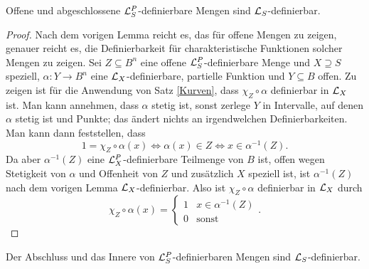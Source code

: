 \begin{theorem}
	Offene und abgeschlossene $\mathcal{L}^P_S$-definierbare Mengen sind $\mathcal{L}_S$-definierbar.
\end{theorem}
\begin{proof}
	Nach dem vorigen Lemma reicht es, das für offene Mengen zu zeigen, genauer reicht es, die Definierbarkeit für charakteristische Funktionen solcher Mengen zu zeigen. Sei $Z\subseteq B^n$ eine offene $\mathcal{L}^P_S$-definierbare Menge und $X\supseteq S$ speziell, $\alpha:Y\rightarrow B^n$ eine $\mathcal{L}_X$-definierbare, partielle Funktion und $Y\subseteq B$ offen. Zu zeigen ist für die Anwendung von Satz \ref{Kurven}, dass $\chi_Z\circ\alpha$ definierbar in $\mathcal{L}_X$ ist. Man kann annehmen, dass $\alpha$ stetig ist, sonst zerlege $Y$ in Intervalle, auf denen $\alpha$ stetig ist und Punkte; das ändert nichts an irgendwelchen Definierbarkeiten. Man kann dann feststellen, dass $$1=\chi_Z\circ\alpha(x)\Leftrightarrow\alpha(x)\in Z\Leftrightarrow x\in\alpha^{-1}(Z).$$ Da aber $\alpha^{-1}(Z)$ eine $\mathcal{L}^P_X$-definierbare Teilmenge von $B$ ist, offen wegen Stetigkeit von $\alpha$ und Offenheit von $Z$ und zusätzlich $X$ speziell ist, ist $\alpha^{-1}(Z)$ nach dem vorigen Lemma $\mathcal{L}_X$-definierbar. Also ist $\chi_Z\circ\alpha$ definierbar in $\mathcal{L}_X$ durch $$\chi_Z\circ\alpha(x)=\left\{\begin{array}{ll}
	1&x\in\alpha^{-1}(Z)\\
	0&\text{sonst}
	\end{array}\right..$$
\end{proof}

\begin{corollary}
	Der Abschluss und das Innere von $\mathcal{L}^P_S$-definierbaren Mengen sind $\mathcal{L}_S$-definierbar.
\end{corollary}
